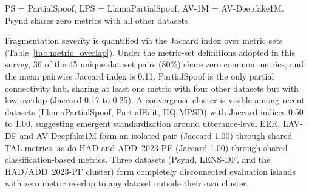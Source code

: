 \begin{table}[t]
\centering
\caption{Pairwise metric overlap among ten partial deepfake datasets. Only the nine non-zero pairs are listed; under these definitions, the remaining 36 of 45 pairs (80\%) share zero common metrics. Jaccard index $= |A \cap B| / |A \cup B|$ over metric sets. Two metrics are counted as shared only if they use the same formulation (e.g., LENS-DF's discrete fixed-window AP@IoU is distinct from LAV-DF's continuous-segment AP@IoU). Mean pairwise Jaccard index: 0.11.}
\label{tab:metric_overlap}
\small
{}
\vspace{2pt}

\raggedright\footnotesize PS = PartialSpoof, LPS = LlamaPartialSpoof, AV-1M = AV-Deepfake1M.\\
Psynd shares zero metrics with all other datasets.
\end{table}

Fragmentation severity is quantified via the Jaccard index over metric sets (Table~\ref{tab:metric_overlap}). Under the metric-set definitions adopted in this survey, 36 of the 45 unique dataset pairs (80\%) share zero common metrics, and the mean pairwise Jaccard index is 0.11. PartialSpoof is the only partial connectivity hub, sharing at least one metric with four other datasets but with low overlap (Jaccard 0.17 to 0.25). A convergence cluster is visible among recent datasets (LlamaPartialSpoof, PartialEdit, HQ-MPSD) with Jaccard indices 0.50 to 1.00, suggesting emergent standardization around utterance-level EER. LAV-DF and AV-Deepfake1M form an isolated pair (Jaccard 1.00) through shared TAL metrics, as do HAD and ADD~2023-PF (Jaccard 1.00) through shared classification-based metrics. Three datasets (Psynd, LENS-DF, and the HAD/ADD~2023-PF cluster) form completely disconnected evaluation islands with zero metric overlap to any dataset outside their own cluster.

